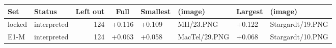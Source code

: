 \begin{tabular}{@{}llrcllll@{}}
\toprule
Set & Status & Left out & Full & Smallest & (image) & Largest & (image) \\
\midrule
locked & interpreted & 124 & +0.116 & +0.109 & MH/23.PNG & +0.122 & Stargardt/19.PNG \\
E1-M & interpreted & 124 & +0.063 & +0.058 & MacTel/29.PNG & +0.068 & Stargardt/10.PNG \\
\bottomrule
\end{tabular}

